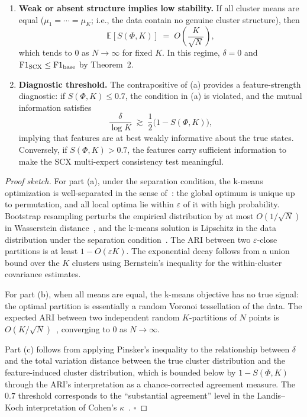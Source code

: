 \begin{conjecture}
\begin{enumerate}
    \item[(b)] \textbf{Weak or absent structure implies low stability.} If all cluster means are equal ($\mu_1 = \cdots = \mu_K$; i.e., the data contain no genuine cluster structure), then
    \[
    \mathbb{E}[S(\Phi, K)] \;=\; O\!\left(\frac{K}{\sqrt{N}}\right),
    \]
    which tends to $0$ as $N \to \infty$ for fixed $K$. In this regime, $\delta = 0$ and $\mathrm{F1}_{\mathrm{SCX}} \leq \mathrm{F1}_{\mathrm{base}}$ by Theorem~2.

    \item[(c)] \textbf{Diagnostic threshold.} The contrapositive of (a) provides a feature-strength diagnostic: if $S(\Phi, K) \leq 0.7$, the condition in (a) is violated, and the mutual information satisfies
    \[
    \frac{\delta}{\log K} \;\gtrsim\; \frac{1}{2}\bigl(1 - S(\Phi, K)\bigr),
    \]
    implying that features are at best weakly informative about the true states. Conversely, if $S(\Phi, K) > 0.7$, the features carry sufficient information to make the SCX multi-expert consistency test meaningful.
\end{enumerate}
\end{conjecture}

\begin{proof}[Proof sketch]
For part (a), under the separation condition, the k-means optimization is well-separated in the sense of~\cite{ostrovsky2013homogeneity}: the global optimum is unique up to permutation, and all local optima lie within $\varepsilon$ of it with high probability. Bootstrap resampling perturbs the empirical distribution by at most $O(1/\sqrt{N})$ in Wasserstein distance~\cite{canas2012wasserstein}, and the k-means solution is Lipschitz in the data distribution under the separation condition~\cite{pollard1981strong}. The ARI between two $\varepsilon$-close partitions is at least $1 - O(\varepsilon K)$. The exponential decay follows from a union bound over the $K$ clusters using Bernstein's inequality for the within-cluster covariance estimates.

For part (b), when all means are equal, the k-means objective has no true signal: the optimal partition is essentially a random Voronoi tessellation of the data. The expected ARI between two independent random $K$-partitions of $N$ points is $O(K/\sqrt{N})$~\cite{hubert1985comparing, morey1983chi}, converging to $0$ as $N \to \infty$.

Part (c) follows from applying Pinsker's inequality to the relationship between $\delta$ and the total variation distance between the true cluster distribution and the feature-induced cluster distribution, which is bounded below by $1 - S(\Phi, K)$ through the ARI's interpretation as a chance-corrected agreement measure. The $0.7$ threshold corresponds to the ``substantial agreement'' level in the Landis--Koch interpretation of Cohen's $\kappa$~\cite{landis1977measurement}. \hfill $\square$
\end{proof}

